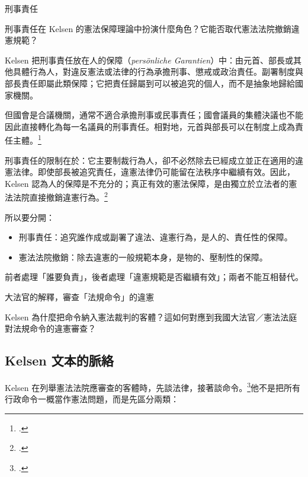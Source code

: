 \begin{qaprompt}
刑事責任
\end{qaprompt}

\begin{qaquestion}
刑事責任在 Kelsen 的憲法保障理論中扮演什麼角色？它能否取代憲法法院撤銷違憲規範？
\end{qaquestion}

Kelsen 把刑事責任放在人的保障（\emph{persönliche Garantien}）中：由元首、部長或其他具體行為人，對違反憲法或法律的行為承擔刑事、懲戒或政治責任。副署制度與部長責任即屬此類保障；它把責任歸屬到可以被追究的個人，而不是抽象地歸給國家機關。

但國會是合議機關，通常不適合承擔刑事或民事責任；國會議員的集體決議也不能因此直接轉化為每一名議員的刑事責任。相對地，元首與部長可以在制度上成為責任主體。\footcites[43--44]{kelsen2015}[51--52]{kelsen1929}

刑事責任的限制在於：它主要制裁行為人，卻不必然除去已經成立並正在適用的違憲法律。即使部長被追究責任，違憲法律仍可能留在法秩序中繼續有效。因此，Kelsen 認為人的保障是不充分的；真正有效的憲法保障，是由獨立於立法者的憲法法院直接撤銷違憲行為。\footcites[43--44]{kelsen2015}[51--52]{kelsen1929}

所以要分開：

\begin{itemize}
\tightlist
\item
  刑事責任：追究誰作成或副署了違法、違憲行為，是人的、責任性的保障。
\item
  憲法法院撤銷：除去違憲的一般規範本身，是物的、壓制性的保障。
\end{itemize}

前者處理「誰要負責」，後者處理「違憲規範是否繼續有效」；兩者不能互相替代。


\begin{qaprompt}
大法官的解釋，審查「法規命令」的違憲
\end{qaprompt}

\begin{qaquestion}
Kelsen 為什麼把命令納入憲法裁判的客體？這如何對應到我國大法官／憲法法庭對法規命令的違憲審查？
\end{qaquestion}

\subsection{Kelsen 文本的脈絡}

Kelsen 在列舉憲法法院應審查的客體時，先談法律，接著談命令。\footcites[48--51]{kelsen2015}[57--60]{kelsen1929}他不是把所有行政命令一概當作憲法問題，而是先區分兩類：

